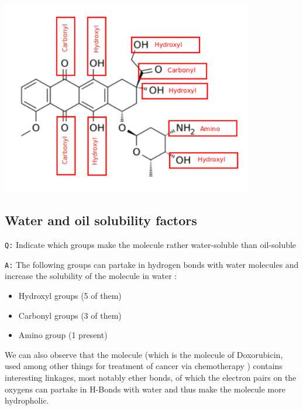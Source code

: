 \documentclass[11pt, a4paper,titlepage]{article}
\begin{document}
\includegraphics[width=11cm]{./Figures/Part3MoleculeFunctionalGroups.pdf}
\subsection{Water and oil solubility factors}
\label{sec-3-2}

\texttt{Q:} Indicate which groups make the molecule rather water-soluble
than oil-soluble

\texttt{A:} The following groups can partake in hydrogen bonds with water
molecules and increase the solubility of the molecule in water :

\begin{itemize}
\item Hydroxyl groups (5 of them)
\item Carbonyl groups (3 of them)
\item Amino group (1 present)
\end{itemize}

We can also observe that the molecule (which is the molecule of
Doxorubicin, used among other things for treatment of cancer via
chemotherapy \cite{Doxorubicin}) contains interesting linkages, most
notably ether bonds, of which the electron pairs on the oxygens can
partake in H-Bonds with water and thus make the molecule more
hydropholic.

\vfill


\end{document}
